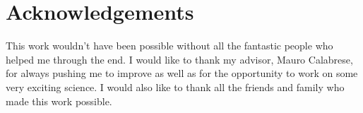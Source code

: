 \documentclass[11pt,letterpaper,twosided]{report}
\begin{document}
\chapter*{Acknowledgements}
\setcounter{page}{4}
\begin{center}
This work wouldn't have been possible without all the fantastic people who helped me through the end. I would like to thank my advisor, Mauro Calabrese, for always pushing me to improve as well as for the opportunity to work on some very exciting science. I would also like to thank all the friends and family who made this work possible. 
\end{center}
\tableofcontents
{}
\listoffigures
\listoftables
\clearpage
\end{document}
